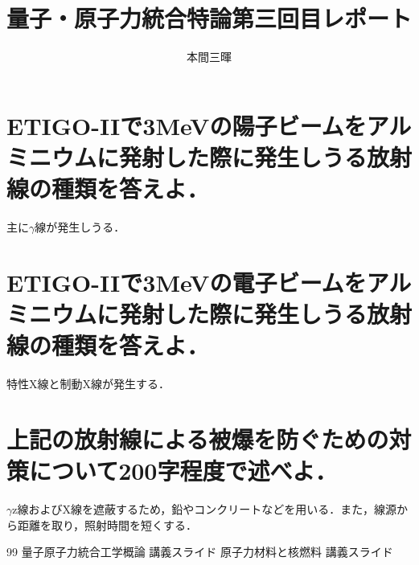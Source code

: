 \documentclass[titlepage,a4paper]{jsarticle}
\title{量子・原子力統合特論第三回目レポート}
\author{本間三暉}
\begin{document}
\maketitle
\section{ETIGO-IIで3MeVの陽子ビームをアルミニウムに発射した際に発生しうる放射線の種類を答えよ．}
主に$\gamma$線が発生しうる．
\section{ETIGO-IIで3MeVの電子ビームをアルミニウムに発射した際に発生しうる放射線の種類を答えよ．}
特性X線と制動X線が発生する．
\section{上記の放射線による被爆を防ぐための対策について200字程度で述べよ．}
$\gamma$z線およびX線を遮蔽するため，鉛やコンクリートなどを用いる．また，線源から距離を取り，照射時間を短くする．
\begin{thebibliography}{99}
量子原子力統合工学概論 講義スライド
原子力材料と核燃料 講義スライド
\end{thebibliography}
\end{document}
